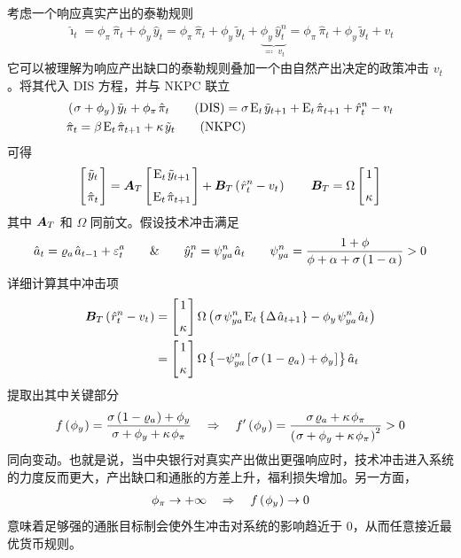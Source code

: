 考虑一个响应真实产出的泰勒规则
\begin{align*}
    \hat\imath_t=\phi_\pi\,\hat\pi_t+\phi_y\,\hat y_t
    =\phi_\pi\,\hat\pi_t+\phi_y\,\tilde y_t+\underbrace{\phi_y\,\hat y^n_t}_{\eqcolon\;v_t}=\phi_\pi\,\hat\pi_t+\phi_y\,\tilde y_t+v_t
\end{align*}
它可以被理解为响应产出缺口的泰勒规则叠加一个由自然产出决定的政策冲击 \(v_t\)。将其代入 DIS 方程，并与 NKPC 联立
\begin{align*}
    &\bka{\sigma+\phi_y}\tilde y_t+\phi_\pi\,\hat\pi_t \tag{DIS}
        =\sigma\,\meant\,\tilde y\nt+\meant\,\hat\pi\nt+\hat r^n_t-v_t\\
    &\hat\pi_t=\beta\,\meant\,\hat\pi\nt+\kappa\,\tilde y_t \tag{NKPC}
\end{align*}
可得
\begin{align*}
    \matbks{\tilde y_t \\[6pt] \hat\pi_t}
    =\bsA_T\matbks{\meant\,\tilde y\nt \\[6pt] \meant\,\hat\pi\nt}
    +\bs B_T\bka{\hat r^n_t-v_t}
    \qquad
    \bs B_T=\Omega\matbks{1 \\[6pt] \kappa}
\end{align*}
其中 \(\bm{A}_T\) 和 \(\Omega\) 同前文。假设技术冲击满足
\begin{align*}
    \hat a_t=\varrho_a\,\hat a\lt+\varepsilon^a_t
    \qquad \& \qquad
    \hat y^n_t=\psi^n_{ya}\,\hat a_t
    \qquad
    \psi^n_{ya}=\dfrac{1+\phi}{\phi+\alpha+\sigma\bka{1-\alpha}}>0
\end{align*}
详细计算其中冲击项
\begin{align*}
    \bs B_T\bka{\hat r^n_t-v_t}&=\matbks{1 \\[6pt] \kappa}\Omega\bka{\sigma\,\psi^n_{ya}\,\meant\bkd{\D\hat a\nt}-\phi_y\,\psi^n_{ya}\,\hat a_t}\\
    &=\matbks{1 \\[6pt] \kappa}\Omega\bkd{-\psi^n_{ya}\bks{\sigma\bka{1-\varrho_a}+\phi_y}}\hat a_t
\end{align*}
提取出其中关键部分
\begin{align*}
    f\bka{\phi_y}
        =\dfrac{\sigma\bka{1-\varrho_a}+\phi_y}{\sigma+\phi_y+\kappa\,\phi_\pi}
        \quad\Rightarrow\quad
        f'\bka{\phi_y}
        =\dfrac{\sigma\,\varrho_a+\kappa\,\phi_\pi}{\bka{\sigma+\phi_y+\kappa\,\phi_\pi}^2}>0
\end{align*}
同向变动。也就是说，当中央银行对真实产出做出更强响应时，技术冲击进入系统的力度反而更大，产出缺口和通胀的方差上升，福利损失增加。另一方面，
\begin{align*}
    \phi_\pi\to+\infty \quad\Rightarrow\quad f\left(\mspace{1mu}\phi_y\mspace{1mu}\right)\to0
\end{align*}
意味着足够强的通胀目标制会使外生冲击对系统的影响趋近于 0，从而任意接近最优货币规则。

